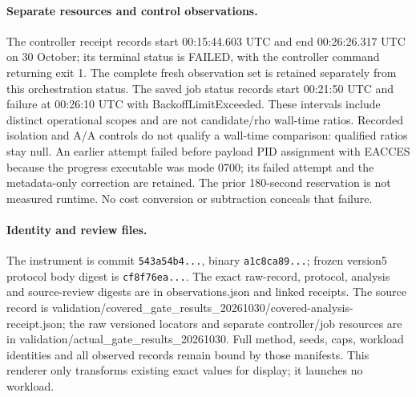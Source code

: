 \documentclass[10pt]{article}
\begin{document}
\paragraph{Separate resources and control observations.} The controller receipt records start 00:15:44.603 UTC and end 00:26:26.317 UTC on 30 October; its terminal status is FAILED, with the controller command returning exit 1. The complete fresh observation set is retained separately from this orchestration status. The saved job status records start 00:21:50 UTC and failure at 00:26:10 UTC with BackoffLimitExceeded. These intervals include distinct operational scopes and are not candidate/rho wall-time ratios. Recorded isolation and A/A controls do not qualify a wall-time comparison: qualified ratios stay null. An earlier attempt failed before payload PID assignment with EACCES because the progress executable was mode 0700; its failed attempt and the metadata-only correction are retained. The prior 180-second reservation is not measured runtime. No cost conversion or subtraction conceals that failure.

\paragraph{Identity and review files.} The instrument is commit \texttt{543a54b4...}, binary \texttt{a1c8ca89...}; frozen version5 protocol body digest is \texttt{cf8f76ea...}. The exact raw-record, protocol, analysis and source-review digests are in observations.json and linked receipts. The source record is validation/covered\_gate\_results\_20261030/covered-analysis-receipt.json; the raw versioned locators and separate controller/job resources are in validation/actual\_gate\_results\_20261030. Full method, seeds, caps, workload identities and all observed records remain bound by those manifests. This renderer only transforms existing exact values for display; it launches no workload.
\end{document}

